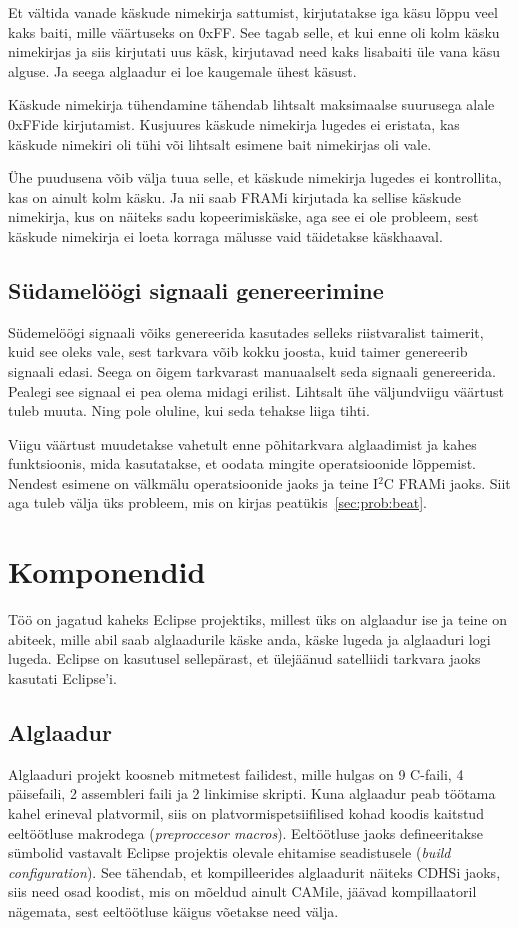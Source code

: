 \documentclass[12pt,a4paper]{article}
\newcommand{\iic}{I${}^2$C }
\begin{document}
Et vältida vanade käskude nimekirja sattumist, kirjutatakse iga käsu lõppu veel
kaks baiti, mille väärtuseks on 0xFF. See tagab selle, et kui enne oli kolm
käsku nimekirjas ja siis kirjutati uus käsk, kirjutavad need kaks lisabaiti üle
vana käsu alguse. Ja seega alglaadur ei loe kaugemale ühest käsust.

Käskude nimekirja tühendamine tähendab lihtsalt maksimaalse suurusega alale
0xFFide kirjutamist. Kusjuures käskude nimekirja lugedes ei eristata, kas
käskude nimekiri oli tühi või lihtsalt esimene bait nimekirjas oli vale.

Ühe puudusena võib välja tuua selle, et käskude nimekirja lugedes ei
kontrollita, kas on ainult kolm käsku. Ja nii saab FRAMi kirjutada ka sellise
käskude nimekirja, kus on näiteks sadu kopeerimiskäske, aga see ei ole probleem,
sest käskude nimekirja ei loeta korraga mälusse vaid täidetakse käskhaaval.


\subsection{Südamelöögi signaali genereerimine}
Südemelöögi signaali võiks genereerida kasutades selleks riistvaralist taimerit,
kuid see oleks vale, sest tarkvara võib kokku joosta, kuid taimer genereerib
signaali edasi. Seega on õigem tarkvarast manuaalselt seda signaali genereerida.
Pealegi see signaal ei pea olema midagi erilist. Lihtsalt ühe väljundviigu
väärtust tuleb muuta. Ning pole oluline, kui seda tehakse liiga tihti.

Viigu väärtust muudetakse vahetult enne põhitarkvara alglaadimist ja kahes
funktsioonis, mida kasutatakse, et oodata mingite operatsioonide lõppemist.
Nendest esimene on välkmälu operatsioonide jaoks ja teine \iic FRAMi jaoks. Siit
aga tuleb välja üks probleem, mis on kirjas peatükis~\ref{sec:prob:beat}. 

\section{Komponendid}
Töö on jagatud kaheks Eclipse projektiks, millest üks on alglaadur ise ja teine on
abiteek, mille abil saab alglaadurile käske anda, käske lugeda ja alglaaduri
logi lugeda. Eclipse on kasutusel sellepärast, et ülejäänud satelliidi tarkvara jaoks
kasutati Eclipse'i. 

\subsection{Alglaadur}
Alglaaduri projekt koosneb mitmetest failidest, mille hulgas on 9 C-faili, 4
päisefaili, 2 assembleri faili ja 2 linkimise skripti. Kuna alglaadur peab töötama kahel erineval
platvormil, siis on platvormispetsiifilised kohad koodis kaitstud eeltöötluse
makrodega (\textit{preproccesor macros}). Eeltöötluse jaoks defineeritakse
sümbolid vastavalt Eclipse projektis olevale ehitamise seadistusele
(\textit{build configuration}). See tähendab, et kompilleerides alglaadurit
näiteks CDHSi jaoks, siis need osad koodist, mis on mõeldud ainult CAMile,
jäävad kompillaatoril nägemata, sest eeltöötluse käigus võetakse need välja.
\end{document}
